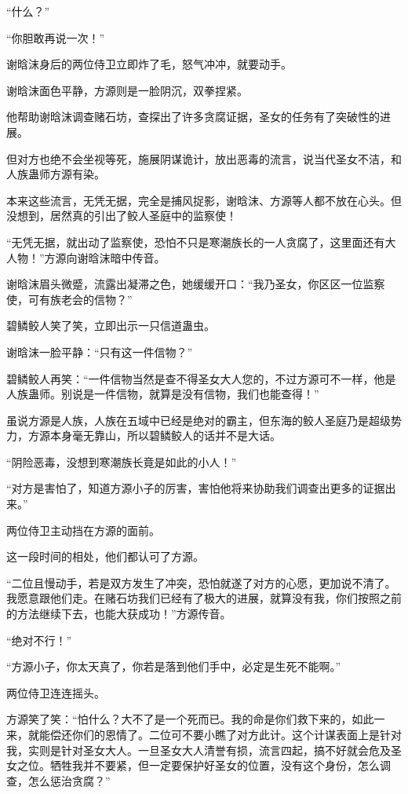 \begin{this_body}
“什么？”

“你胆敢再说一次！”

谢晗沫身后的两位侍卫立即炸了毛，怒气冲冲，就要动手。

谢晗沫面色平静，方源则是一脸阴沉，双拳捏紧。

他帮助谢晗沫调查赌石坊，查探出了许多贪腐证据，圣女的任务有了突破性的进展。

但对方也绝不会坐视等死，施展阴谋诡计，放出恶毒的流言，说当代圣女不洁，和人族蛊师方源有染。

本来这些流言，无凭无据，完全是捕风捉影，谢晗沫、方源等人都不放在心头。但没想到，居然真的引出了鲛人圣庭中的监察使！

“无凭无据，就出动了监察使，恐怕不只是寒潮族长的一人贪腐了，这里面还有大人物！”方源向谢晗沫暗中传音。

谢晗沫眉头微蹙，流露出凝滞之色，她缓缓开口：“我乃圣女，你区区一位监察使，可有族老会的信物？”

碧鳞鲛人笑了笑，立即出示一只信道蛊虫。

谢晗沫一脸平静：“只有这一件信物？”

碧鳞鲛人再笑：“一件信物当然是查不得圣女大人您的，不过方源可不一样，他是人族蛊师。别说是一件信物，就算是没有信物，我们也能查得！”

虽说方源是人族，人族在五域中已经是绝对的霸主，但东海的鲛人圣庭乃是超级势力，方源本身毫无靠山，所以碧鳞鲛人的话并不是大话。

“阴险恶毒，没想到寒潮族长竟是如此的小人！”

“对方是害怕了，知道方源小子的厉害，害怕他将来协助我们调查出更多的证据出来。”

两位侍卫主动挡在方源的面前。

这一段时间的相处，他们都认可了方源。

“二位且慢动手，若是双方发生了冲突，恐怕就遂了对方的心愿，更加说不清了。我愿意跟他们走。在赌石坊我们已经有了极大的进展，就算没有我，你们按照之前的方法继续下去，也能大获成功！”方源传音。

“绝对不行！”

“方源小子，你太天真了，你若是落到他们手中，必定是生死不能啊。”

两位侍卫连连摇头。

方源笑了笑：“怕什么？大不了是一个死而已。我的命是你们救下来的，如此一来，就能偿还你们的恩情了。二位可不要小瞧了对方此计。这个计谋表面上是针对我，实则是针对圣女大人。一旦圣女大人清誉有损，流言四起，搞不好就会危及圣女之位。牺牲我并不要紧，但一定要保护好圣女的位置，没有这个身份，怎么调查，怎么惩治贪腐？”


\end{this_body}
